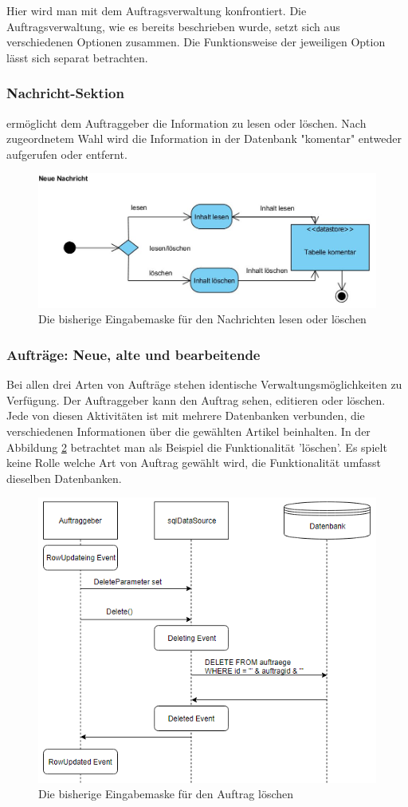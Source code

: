 Hier wird man mit dem Auftragsverwaltung konfrontiert. Die Auftragsverwaltung, wie es bereits beschrieben wurde, setzt sich aus verschiedenen Optionen zusammen. Die Funktionsweise der jeweiligen Option lässt sich separat betrachten. 
	
\subsubsection{Nachricht-Sektion} ermöglicht dem Auftraggeber die Information zu lesen oder löschen. Nach zugeordnetem Wahl wird die Information in der Datenbank "komentar" entweder aufgerufen oder entfernt. 

\begin{figure}[h]
	\centering
	\includegraphics[width=0.8\linewidth]{Graphics/NeueNachricht.JPG}
	\caption[Kommunikation]{Die bisherige Eingabemaske für den Nachrichten lesen oder löschen}
	\label{fig:Kommunikation}
\end{figure}



\subsubsection{Aufträge: Neue, alte und bearbeitende}

Bei allen drei Arten von Aufträge stehen identische Verwaltungsmöglichkeiten zu Verfügung. Der Auftraggeber kann den Auftrag sehen, editieren oder löschen. Jede von diesen Aktivitäten ist mit mehrere Datenbanken verbunden, die verschiedenen Informationen über die gewählten Artikel beinhalten. In der Abbildung \ref{fig:Autrag_Loeschen} betrachtet man als Beispiel die Funktionalität 'löschen'. Es spielt keine Rolle welche Art von Auftrag gewählt wird, die Funktionalität umfasst dieselben Datenbanken.


\begin{figure}[h]
	\centering
	\includegraphics[width=0.6\linewidth]{Graphics/auftragLoeschen.png}
	\caption[AutragLoeschen]{Die bisherige Eingabemaske für den Auftrag löschen}
	\label{fig:Autrag_Loeschen}
\end{figure}

